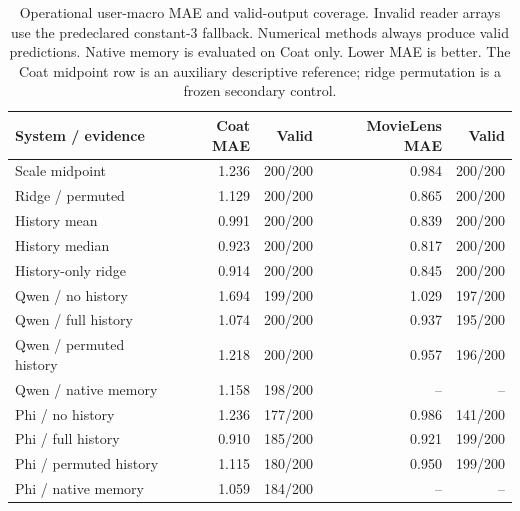 \begin{table}[t]
\centering\small
\caption{Operational user-macro MAE and valid-output coverage. Invalid reader arrays use the predeclared constant-3 fallback. Numerical methods always produce valid predictions. Native memory is evaluated on Coat only. Lower MAE is better. The Coat midpoint row is an auxiliary descriptive reference; ridge permutation is a frozen secondary control.}
\label{tab:main-results}
\begin{tabular}{lrrrr}
\toprule
System / evidence & Coat MAE & Valid & MovieLens MAE & Valid\\
\midrule
Scale midpoint & 1.236 & 200/200 & 0.984 & 200/200\\
Ridge / permuted & 1.129 & 200/200 & 0.865 & 200/200\\
History mean & 0.991 & 200/200 & 0.839 & 200/200\\
History median & 0.923 & 200/200 & 0.817 & 200/200\\
History-only ridge & 0.914 & 200/200 & 0.845 & 200/200\\
Qwen / no history & 1.694 & 199/200 & 1.029 & 197/200\\
Qwen / full history & 1.074 & 200/200 & 0.937 & 195/200\\
Qwen / permuted history & 1.218 & 200/200 & 0.957 & 196/200\\
Qwen / native memory & 1.158 & 198/200 & -- & --\\
Phi / no history & 1.236 & 177/200 & 0.986 & 141/200\\
Phi / full history & 0.910 & 185/200 & 0.921 & 199/200\\
Phi / permuted history & 1.115 & 180/200 & 0.950 & 199/200\\
Phi / native memory & 1.059 & 184/200 & -- & --\\
\bottomrule
\end{tabular}
\end{table}
